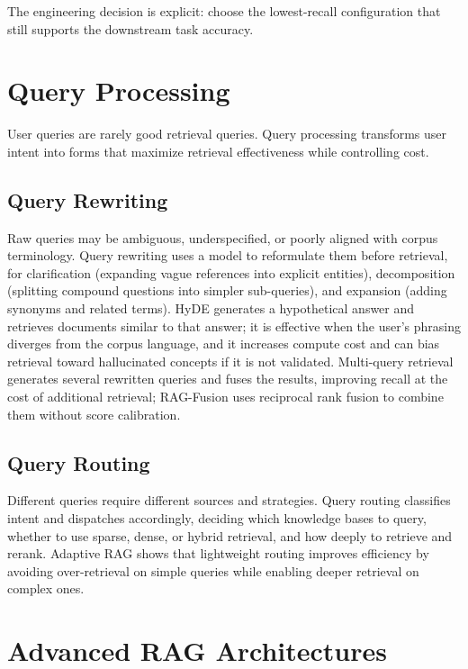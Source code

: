 \documentclass[11pt]{book}
\begin{document}
The engineering decision is explicit: choose the lowest-recall configuration that still supports the downstream task accuracy.

\section{Query Processing}

User queries are rarely good retrieval queries. Query processing transforms user intent into forms that maximize retrieval effectiveness while controlling cost.

\subsection{Query Rewriting}

Raw queries may be ambiguous, underspecified, or poorly aligned with corpus terminology. Query rewriting uses a model to reformulate them before retrieval, for clarification (expanding vague references into explicit entities), decomposition (splitting compound questions into simpler sub-queries), and expansion (adding synonyms and related terms). HyDE \cite{hyde} generates a hypothetical answer and retrieves documents similar to that answer; it is effective when the user's phrasing diverges from the corpus language, and it increases compute cost and can bias retrieval toward hallucinated concepts if it is not validated. Multi-query retrieval generates several rewritten queries and fuses the results, improving recall at the cost of additional retrieval; RAG-Fusion \cite{ragfusion} uses reciprocal rank fusion to combine them without score calibration.

\subsection{Query Routing}

Different queries require different sources and strategies. Query routing classifies intent and dispatches accordingly, deciding which knowledge bases to query, whether to use sparse, dense, or hybrid retrieval, and how deeply to retrieve and rerank. Adaptive RAG \cite{adaptiverag} shows that lightweight routing improves efficiency by avoiding over-retrieval on simple queries while enabling deeper retrieval on complex ones.

\section{Advanced RAG Architectures}
\end{document}
